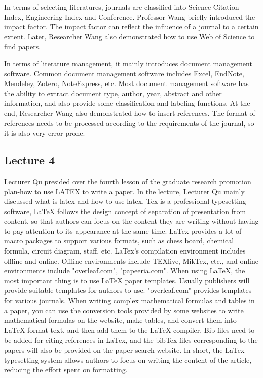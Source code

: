 \documentclass[UTF-8]{ctexart}
\begin{document}
In terms of selecting literatures, journals are classified into Science Citation Index, Engineering Index and Conference. Professor Wang briefly introduced the impact factor. The impact factor can reflect the influence of a journal to a certain extent. Later, Researcher Wang also demonstrated how to use Web of Science to find papers.

In terms of literature management, it mainly introduces document management software. Common document management software includes Excel, EndNote, Mendeley, Zotero, NoteExpress, etc. Most document management software has the ability to extract document type, author, year, abstract and other information, and also provide some classification and labeling functions. At the end, Researcher Wang also demonstrated how to insert references. The format of references needs to be processed according to the requirements of the journal, so it is also very error-prone.

\subsection{Lecture 4} 
Lecturer Qu presided over the fourth lesson of the graduate research promotion plan-how to use LATEX to write a paper. In the lecture, Lecturer Qu mainly discussed what is latex and how to use latex.
Tex is a professional typesetting software, LaTeX follows the design concept of separation of presentation from content, so that authors can focus on the content they are writing without having to pay attention to its appearance at the same time. LaTex provides a lot of macro packages to support various formats, such as chess board, chemical formula, circuit diagram, staff, etc. LaTex's compilation environment includes offline and online. Offline environments include TEXlive, MikTex, etc., and online environments include "overleaf.com", "papeeria.com".
When using LaTeX, the most important thing is to use LaTeX paper templates. Usually publishers will provide suitable templates for authors to use. "overleaf.com" provides templates for various journals. When writing complex mathematical formulas and tables in a paper, you can use the conversion tools provided by some websites to write mathematical formulas on the website, make tables, and convert them into LaTeX format text, and then add them to the LaTeX compiler. Bib files need to be added for citing references in LaTex, and the bibTex files corresponding to the papers will also be provided on the paper search website.
In short, the LaTex typesetting system allows authors to focus on writing the content of the article, reducing the effort spent on formatting.
\end{document}
